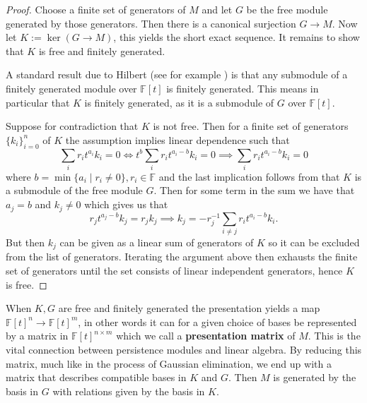 \begin{proof}
Choose a finite set of generators of $M$ and let $G$ be the free module generated by those generators. Then there is a canonical surjection $G \to M$. Now let $K := \ker(G \to M)$, this yields the short exact sequence. It remains to show that $K$ is free and finitely generated.

A standard result due to Hilbert (see for example \cite[Theorem 4, p. ~76]{Cox+Others/1991/Ideals}) is that any submodule of a finitely generated module over $\mathbb{F}[t]$ is finitely generated. This means in particular that $K$ is finitely generated, as it is a submodule of $G$ over $\mathbb{F}[t]$.

Suppose for contradiction that $K$ is not free. Then for a finite set of generators $\{k_{i}\}^{n}_{i=0}$ of $K$ the assumption implies linear dependence such that
\[\sum_{i} r_{i}t^{a_{i}}k_{i}=0  \iff t^{b} \sum_{i} r_{i}t^{a_{i}-b}k_{i} = 0 \implies \sum_{i} r_{i}t^{a_{i}-b}k_{i} = 0 \]
where $b = \min\{a_{i} \mid r_{i} \neq 0\}, r_{i} \in \mathbb{F}$ and the last implication follows from that $K$ is a submodule of the free module $G$. Then for some term in the sum we have that $a_{j}=b$ and $ k_{j} \neq 0 $ which gives us that
\[
  r_{j}t^{a_{j}-b}k_{j}=r_{j}k_{j} \implies k_{j} = - r_{j}^{-1}\sum_{i \neq j} r_{i}t^{a_{i}-b}k_{i}.
\]
But then $k_{j}$ can be given as a linear sum of generators of $K$ so it can be excluded from the list of generators. Iterating the argument above then exhausts the finite set of generators until the set consists of linear independent generators, hence $K$ is free.
\end{proof}
When $K,G$ are free and finitely generated the presentation yields a map $\mathbb{F}[t]^{n} \to \mathbb{F}[t]^{m}$, in other words it can for a given choice of bases be represented by a matrix in $\mathbb{F}[t]^{n \times m}$ which we call a \textbf{presentation matrix} of $M$. This is the vital connection between persistence modules and linear algebra. By reducing this matrix, much like in the process of Gaussian elimination, we end up with a matrix that describes compatible bases in $K$ and $G$. Then $M$ is generated by the basis in $G$ with relations given by the basis in $K$.

